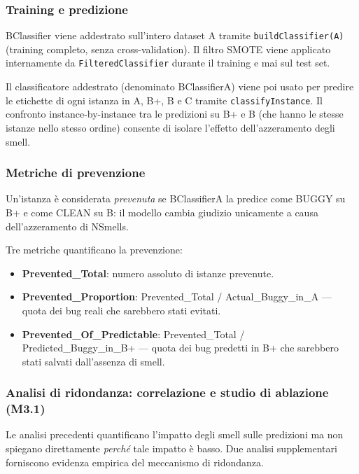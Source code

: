 \subsubsection{Training e predizione}

BClassifier viene addestrato sull'intero dataset A tramite \texttt{buildClassifier(A)}
(training completo, senza cross-validation). Il filtro SMOTE viene applicato
internamente da \texttt{FilteredClassifier} durante il training e mai sul test set.

Il classificatore addestrato (denominato BClassifierA) viene poi usato per predire le
etichette di ogni istanza in A, B+, B e C tramite \texttt{classifyInstance}. Il confronto
instance-by-instance tra le predizioni su B+ e B (che hanno le stesse istanze nello stesso
ordine) consente di isolare l'effetto dell'azzeramento degli smell.

\subsubsection{Metriche di prevenzione}

Un'istanza è considerata \textit{prevenuta} se BClassifierA la predice come BUGGY su B+ e
come CLEAN su B: il modello cambia giudizio unicamente a causa dell'azzeramento di NSmells.

Tre metriche quantificano la prevenzione:
\begin{itemize}
  \item \textbf{Prevented\_Total}: numero assoluto di istanze prevenute.
  \item \textbf{Prevented\_Proportion}: Prevented\_Total / Actual\_Buggy\_in\_A — quota
        dei bug reali che sarebbero stati evitati.
  \item \textbf{Prevented\_Of\_Predictable}: Prevented\_Total / Predicted\_Buggy\_in\_B+
        — quota dei bug predetti in B+ che sarebbero stati salvati dall'assenza di smell.
\end{itemize}

\subsubsection{Analisi di ridondanza: correlazione e studio di ablazione (M3.1)}

Le analisi precedenti quantificano l'impatto degli smell sulle predizioni ma non spiegano
direttamente \textit{perché} tale impatto è basso. Due analisi supplementari forniscono
evidenza empirica del meccanismo di ridondanza.

